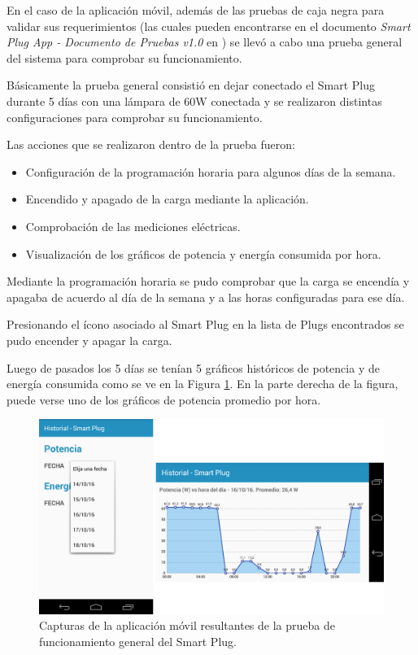 En el caso de la aplicación móvil, además de las pruebas de caja negra para validar sus requerimientos (las cuales pueden encontrarse en el documento \textit{Smart Plug App - Documento de Pruebas v1.0} en \citep{repo_docu_app}) se llevó a cabo una prueba general del sistema para comprobar su funcionamiento.

Básicamente la prueba general consistió en dejar conectado el Smart Plug durante 5 días con una lámpara de 60W conectada y se realizaron distintas configuraciones para comprobar su funcionamiento.

Las acciones que se realizaron dentro de la prueba fueron:

\begin{itemize}
\item Configuración de la programación horaria para algunos días de la semana.
\item Encendido y apagado de la carga mediante la aplicación.
\item Comprobación de las mediciones eléctricas.
\item Visualización de los gráficos de potencia y energía consumida por hora.
\end{itemize}

Mediante la programación horaria se pudo comprobar que la carga se encendía y apagaba de acuerdo al día de la semana y a las horas configuradas para ese día.

Presionando el ícono asociado al Smart Plug en la lista de Plugs encontrados se pudo encender y apagar la carga.

Luego de pasados los 5 días se tenían 5 gráficos históricos de potencia y de energía consumida como se ve en la Figura \ref{fig:integracion}. En la parte derecha de la figura, puede verse uno de los gráficos de potencia promedio por hora.


\begin{figure}[h]
	\centering
	\includegraphics[width=12cm]{./Figures/4_1_3_integracion.png}
	\caption{Capturas de la aplicación móvil resultantes de la prueba de funcionamiento general del Smart Plug.}
	\label{fig:integracion}
\end{figure}